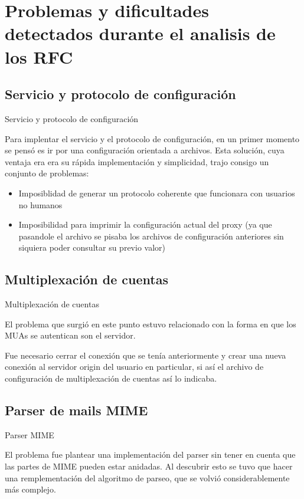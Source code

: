 \documentclass{beamer}
\begin{document}
\section{Problemas y dificultades detectados durante el analisis de los RFC}
\subsection{Servicio y protocolo de configuración}
\begin{frame}{Servicio y protocolo de configuración}
\par Para implentar el servicio y el protocolo de configuración, en un primer momento se pensó es ir por una configuración orientada a archivos. Esta solución, cuya ventaja era era su rápida implementación y simplicidad, trajo consigo un conjunto de problemas:\\
\begin{itemize}
\item Imposiblidad de generar un protocolo coherente que funcionara con usuarios no humanos
\item Imposibilidad para imprimir la configuración actual del proxy (ya que pasandole el archivo se pisaba los archivos de configuración anteriores sin siquiera poder consultar su previo valor)
\end{itemize}
\end{frame}

\subsection{Multiplexación de cuentas}
\begin{frame}{Multiplexación de cuentas}
\par El problema que surgió en este punto estuvo relacionado con la forma en que los MUAs se autentican son el servidor. \\[0.5cm]
\par Fue necesario cerrar el conexión que se tenía anteriormente y crear una nueva conexión al servidor origin del usuario en particular, si así el archivo de configuración de multiplexación de cuentas así lo indicaba.
\end{frame}

\subsection{Parser de mails MIME}
\begin{frame}{Parser MIME}
\par El problema fue plantear una implementación del parser sin tener en cuenta que las partes de MIME pueden estar anidadas. Al descubrir esto se tuvo que hacer una remplementación del algoritmo de parseo, que se volvió considerablemente más complejo.
\end{frame}
\end{document}
